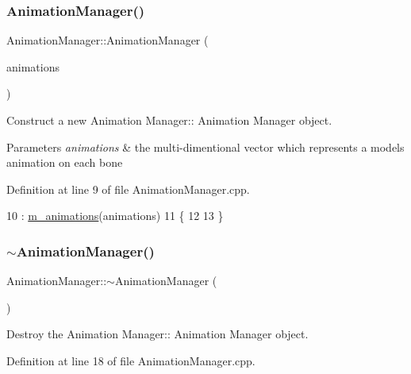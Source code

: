 \subsubsection{\texorpdfstring{Animation\+Manager()}{AnimationManager()}\hspace{0.1cm}{\footnotesize\ttfamily [2/2]}}
{\footnotesize\ttfamily Animation\+Manager\+::\+Animation\+Manager (\begin{DoxyParamCaption}\item[{std\+::shared\+\_\+ptr$<$ std\+::vector$<$ std\+::vector$<$ std\+::vector$<$ X\+M\+M\+A\+T\+R\+IX $>$$>$$>$$>$}]{animations }\end{DoxyParamCaption})}



Construct a new Animation Manager\+:\+: Animation Manager object. 


\begin{DoxyParams}{Parameters}
{\em animations} & the multi-\/dimentional vector which represents a models animation on each bone \\
\hline
\end{DoxyParams}


Definition at line 9 of file Animation\+Manager.\+cpp.


\begin{DoxyCode}
10     : \mbox{\hyperlink{class_animation_manager_a30d55ef88d1fcea24ba39a254a84b56a}{m\_animations}}(animations)
11 \{
12     
13 \}
\end{DoxyCode}
\mbox{\label{class_animation_manager_a3a8c725f2aa41692ed7ec4ef0957c365}} 
\subsubsection{\texorpdfstring{$\sim$\+Animation\+Manager()}{~AnimationManager()}}
{\footnotesize\ttfamily Animation\+Manager\+::$\sim$\+Animation\+Manager (\begin{DoxyParamCaption}{ }\end{DoxyParamCaption})}



Destroy the Animation Manager\+:\+: Animation Manager object. 



Definition at line 18 of file Animation\+Manager.\+cpp.


